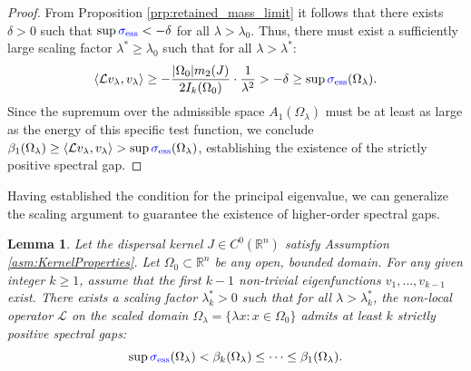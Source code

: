 \documentclass[12pt, a4paper]{article}
\newcommand{\revision}[1]{\textcolor{blue}{#1}}
\theoremstyle{break}
\theoremstyle{break}
\theoremstyle{break}
\theoremstyle{break}
\theoremstyle{break}
\newtheorem{lem}{Lemma}[section]
\theoremstyle{break}
\theoremstyle{break}
\theoremstyle{break}
\theoremstyle{break}
\begin{document}
\begin{proof}
    From Proposition \ref{prp:retained_mass_limit} it follows that there exists $\delta > 0$ such that $\sup \revision{\sigma_{\mathrm{ess}}} < - \delta$ for all $\lambda > \lambda_0$. Thus, there must exist a sufficiently large scaling factor $\lambda^* \geq \lambda_0$ such that for all $\lambda > \lambda^*$:
    \begin{equation}
        \langle \mathcal{L}v_\lambda, v_\lambda \rangle \geq -\frac{|\Omega_0| m_2(J)}{2 I_k(\Omega_0)} \cdot \frac{1}{\lambda^2} > -\delta \geq \sup \revision{\sigma_{\mathrm{ess}}}(\Omega_\lambda).
    \end{equation}
    Since the supremum over the admissible space $A_1(\Omega_\lambda)$ must be at least as large as the energy of this specific test function, we conclude $\beta_1(\Omega_\lambda) \geq \langle \mathcal{L}v_\lambda, v_\lambda \rangle > \sup \revision{\sigma_{\mathrm{ess}}}(\Omega_\lambda)$, establishing the existence of the strictly positive spectral gap.
\end{proof}

Having established the condition for the principal eigenvalue, we can generalize the scaling argument to guarantee the existence of higher-order spectral gaps.

\begin{lem}
    \label{lem:large_domain_gap_k}
    Let the dispersal kernel $J \in C^0(\mathbb{R}^n)$ satisfy Assumption \ref{asm:KernelProperties}. Let $\Omega_0 \subset \mathbb{R}^n$ be any open, bounded domain. For any given integer $k \geq 1$, assume that the first $k-1$ non-trivial eigenfunctions $v_1, \dots, v_{k-1}$ exist. There exists a scaling factor $\lambda_k^* > 0$ such that for all $\lambda > \lambda_k^*$, the non-local operator $\mathcal{L}$ on the scaled domain $\Omega_\lambda = \{ \lambda x : x \in \Omega_0 \}$ admits at least $k$ strictly positive spectral gaps:
    \begin{equation}
        \sup \revision{\sigma_{\mathrm{ess}}}(\Omega_\lambda) < \beta_k(\Omega_\lambda) \leq \dots \leq \beta_1(\Omega_\lambda).
    \end{equation}
\end{lem}
\end{document}
